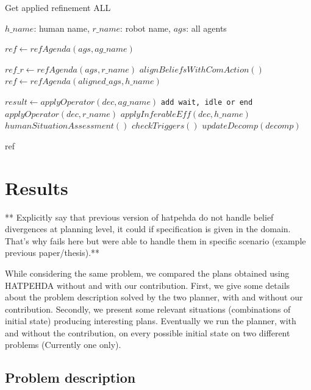 \documentclass[letterpaper]{article} %
\begin{document}
\begin{algorithm}
\caption{Get applied refinement ALL}\label{alg:ap_ref_all}
\begin{algorithmic}
\Require $h\_name$: human name, $r\_name$: robot name, $ags$: all agents

\State $ref \gets refAgenda(ags, ag\_name)$

\State $ref\_r \gets refAgenda(ags, r\_name)$ 
 
    \State $alignBeliefsWithComAction()$
    \State $ref \gets refAgenda(aligned\_ags, h\_name)$
\EndIf


    \State $result \gets applyOperator(dec, ag\_name)$ 
        \State \texttt{add wait, idle or end}
    \Else
        \State $applyOperator(dec, r\_name)$ 
        \State $applyInferableEff(dec, h\_name)$ 
        \State $humanSituationAssessment()$
        \State $checkTriggers()$
        \State $updateDecomp(decomp)$
    \EndIf
\EndFor

\State \Return ref

\end{algorithmic}
\end{algorithm}



\section{Results}


** Explicitly say that previous version of hatpehda do not handle belief divergences at planning level, it could if specification is given in the domain. That's why fails here but were able to handle them in specific scenario (example previous paper/thesis).**

While considering the same problem, we compared the plans obtained using HATPEHDA without and with our contribution. First, we give some details about the problem description solved by the two planner, with and without our contribution. Secondly, we present some relevant situations (combinations of initial state) producing interesting plans. Eventually we run the planner, with and without the contribution, on every possible initial state on two different problems (Currently one only).  

\subsection{Problem description}
\end{document}
